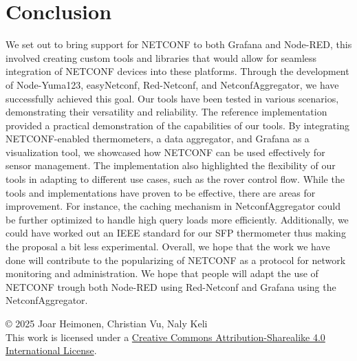 \documentclass[12pt]{article}
\newcommand{\license}{
    \vspace{1em}
    \noindent\small{© 2025 Joar Heimonen,  Christian Vu, Naly Keli\\
    This work is licensed under a \href{https://creativecommons.org/licenses/by-sa/4.0/}{Creative Commons Attribution-Sharealike 4.0 International License}.}
}
\begin{document}
\section{Conclusion}
We set out to bring support for NETCONF to both Grafana and Node-RED, this involved creating 
custom tools and libraries that would allow for seamless integration of NETCONF devices into these platforms. 
Through the development of Node-Yuma123, easyNetconf, Red-Netconf, and NetconfAggregator, we have successfully achieved this goal. 
Our tools have been tested in various scenarios, demonstrating their versatility and reliability.
The reference implementation provided a practical demonstration of the capabilities of our tools. By integrating NETCONF-enabled thermometers, 
a data aggregator, and Grafana as a visualization tool, we showcased how NETCONF can be used effectively for sensor management. 
The implementation also highlighted the flexibility of our tools in adapting to different use cases, such as the rover control flow.
While the tools and implementations have proven to be effective, there are areas for improvement. For instance, the caching mechanism in NetconfAggregator 
could be further optimized to handle high query loads more efficiently. Additionally, we could have worked out an IEEE standard for our SFP thermometer
thus making the proposal a bit less experimental.
Overall, we hope that the work we have done will contribute to the popularizing of NETCONF as a protocol for network monitoring and 
administration. We hope that people will adapt the use of NETCONF trough both Node-RED using Red-Netconf and Grafana using the NetconfAggregator.

\pagebreak
{}
\printbibliography
\listoffigures
{}
\license
\end{document}
